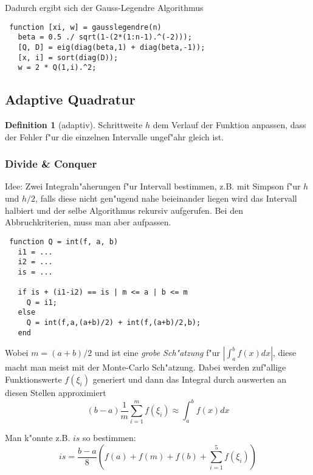 \documentclass[german, 10pt, a4paper, twocolumn]{scrartcl}
\theoremstyle{definition}
\newtheorem*{definition}{Definition}
\begin{document}
Dadurch ergibt sich der Gauss-Legendre Algorithmus

\begin{verbatim}
 function [xi, w] = gausslegendre(n)
   beta = 0.5 ./ sqrt(1-(2*(1:n-1).^(-2)));
   [Q, D] = eig(diag(beta,1) + diag(beta,-1));
   [x, i] = sort(diag(D));
   w = 2 * Q(1,i).^2;
\end{verbatim}

\subsection{Adaptive Quadratur}

\begin{definition}[adaptiv]
	Schrittweite $h$ dem Verlauf der Funktion anpassen, dass der Fehler f"ur die einzelnen Intervalle ungef"ahr gleich ist.
\end{definition}

\subsubsection{Divide \& Conquer}

Idee: Zwei Integraln"aherungen f"ur Intervall bestimmen, z.B. mit Simpson f"ur $h$ und $h/2$, falls diese nicht gen"ugend nahe beieinander liegen wird das Intervall halbiert und der selbe Algorithmus rekursiv aufgerufen. Bei den Abbruchkriterien, muss man aber aufpassen.

\begin{verbatim}
 function Q = int(f, a, b)
   i1 = ...
   i2 = ...
   is = ...

   if is + (i1-i2) == is | m <= a | b <= m
     Q = i1;
   else
     Q = int(f,a,(a+b)/2) + int(f,(a+b)/2,b);
   end
\end{verbatim}

Wobei $m= (a+b)/2$ und \verb@is@ ist eine \textit{grobe Sch"atzung} f"ur $|\int^b_a f(x)dx|$, diese macht man meist mit der Monte-Carlo Sch"atzung. Dabei werden zuf"allige Funktionswerte $f(\xi_i)$ generiert und dann das Integral durch auswerten an diesen Stellen approximiert
\begin{displaymath}
	(b - a) \frac{1}{m}\sum^m_{i=1} f(\xi_i) \approx \int^b_a f(x) dx
\end{displaymath}

Man k"onnte z.B. $is$ so bestimmen:
\begin{displaymath}
	is = \frac{b-a}{8}(f(a) + f(m) + f(b) + \sum^5_{i=1} f(\xi_i))
\end{displaymath}
\end{document}
